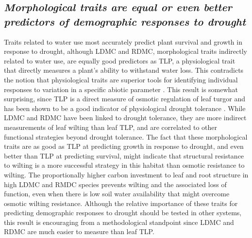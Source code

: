 \documentclass[12pt, letterpaper]{article}
\begin{document}
\subsection{\textit{Morphological traits are equal or even better predictors of demographic responses to drought}} Traits related to water use most accurately predict plant survival and growth in response to drought, although LDMC and RDMC, morphological traits indirectly related to water use, are equally good predictors as TLP, a physiological trait that directly measures a plant's ability to withstand water loss. This contradicts the notion that physiological traits are superior tools for identifying individual responses to variation in a specific abiotic parameter \citep{Volaire2018}. This result is somewhat surprising, since TLP is a direct measure of osmotic regulation of leaf turgor and has been shown to be a good indicator of physiological drought tolerance \citep{Bartlett2012}. While LDMC and RDMC have been linked to drought tolerance, they are more indirect measurements of leaf wilting than leaf TLP, and are correlated to other functional strategies beyond drought tolerance. The fact that these morphological traits are as good as TLP at predicting growth in response to drought, and even better than TLP at predicting survival, might indicate that structural resistance to wilting is a more successful strategy in this habitat than osmotic resistance to wilting. The proportionally higher carbon investment to leaf and root structure in high LDMC and RMDC species prevents wilting and the associated loss of function, even when there is low soil water availability that might overcome osmotic wilting resistance. Although the relative importance of these traits for predicting demographic responses to drought should be tested in other systems, this result is encouraging from a methodological standpoint since LDMC and RDMC are much easier to measure than leaf TLP. 
\end{document}
